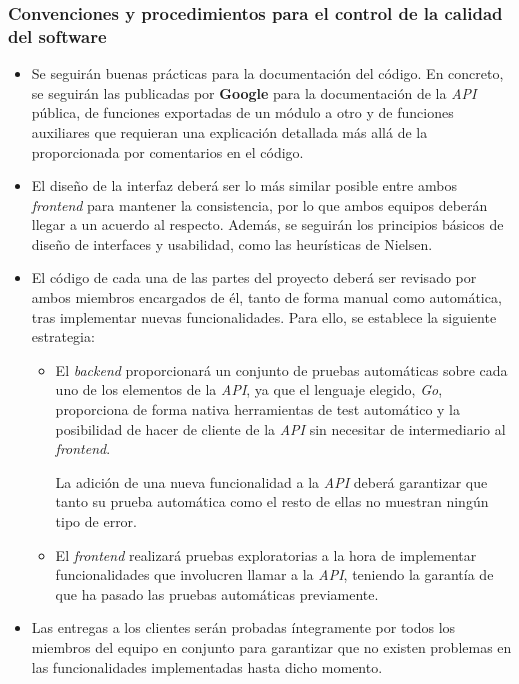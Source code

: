 \documentclass[11pt, a4paper, titlepage]{article}
\begin{document}
\subsubsection{Convenciones y procedimientos para el control de la calidad del software}

\begin{itemize}
    \item Se seguirán buenas prácticas para la documentación del código. En concreto, se seguirán las publicadas por \textbf{Google}\cite{documentaciongoogle} para la documentación de la \textit{API} pública, de funciones exportadas de un módulo a otro y de funciones auxiliares que requieran una explicación detallada más allá de la proporcionada por comentarios en el código.
    
    \item El diseño de la interfaz deberá ser lo más similar posible entre ambos \textit{frontend} para mantener la consistencia, por lo que ambos equipos deberán llegar a un acuerdo al respecto. Además, se seguirán los principios básicos de diseño de interfaces y usabilidad, como las heurísticas de Nielsen\cite{heuristicasnielsen}.
    
    \item El código de cada una de las partes del proyecto deberá ser revisado por ambos miembros encargados de él, tanto de forma manual como automática, tras implementar nuevas funcionalidades. Para  ello, se establece la siguiente estrategia:
    \begin{itemize}
        \item El \textit{backend} proporcionará un conjunto de pruebas automáticas sobre cada uno de los elementos de la \textit{API}, ya que el lenguaje elegido, \textit{Go}, proporciona de forma nativa herramientas de test automático y la posibilidad de hacer de cliente de la \textit{API} sin necesitar de intermediario al \textit{frontend}.
        
        La adición de una nueva funcionalidad a la \textit{API} deberá garantizar que tanto su prueba automática como el resto de ellas no muestran ningún tipo de error.
        
        \item El \textit{frontend} realizará pruebas exploratorias a la hora de implementar funcionalidades que involucren llamar a la \textit{API}, teniendo la garantía de que ha pasado las pruebas automáticas previamente.
        \end{itemize}
    
    
    \item Las entregas a los clientes serán probadas íntegramente por todos los miembros del equipo en conjunto para garantizar que no existen problemas en las funcionalidades implementadas hasta dicho momento. 
    

\end{itemize}
\end{document}
